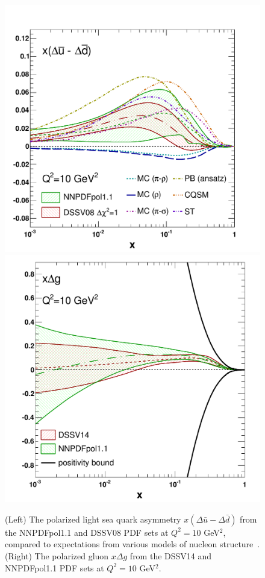 \begin{figure}[!t]
\centering
\includegraphics[scale=0.31]{plots/asysea_2}
\includegraphics[scale=0.287]{plots/gluoncomp}\\
\caption{(Left) The polarized light sea quark asymmetry 
$x(\Delta\bar{u}-\Delta\bar{d})$ from the NNPDFpol1.1 and 
DSSV08 PDF sets at $Q^2=10$ GeV$^2$, compared to expectations from 
various models of nucleon structure~\cite{Chang:2014jba}. 
(Right) The polarized gluon $x\Delta g$ from the 
DSSV14 and NNPDFpol1.1 PDF sets at $Q^2=10$ GeV$^2$.}
\label{fig:RHICpdfs}
\end{figure}

